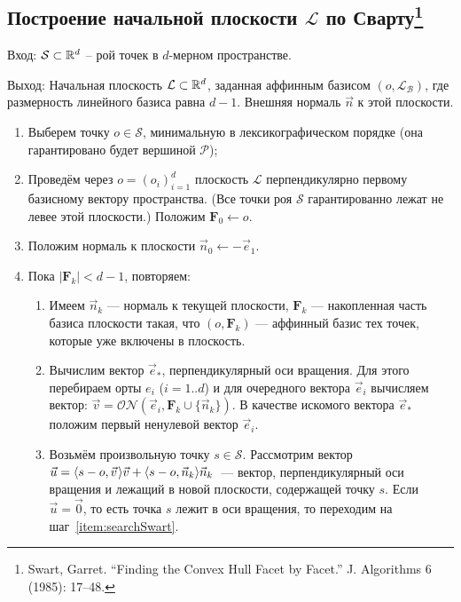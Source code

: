 \documentclass[a4paper,12pt]{article}
\newcommand{\R}[1][]{%
  \ifthenelse{\equal{#1}{}}%
  {\mathbb{R}}%
  {\mathbb{R}^{#1}}}
\newcommand{\Swarm}{\mathcal{S}}              %
\newcommand{\Polytop}{\mathcal{P}}         %
\newcommand{\Basis}{\mathcal{B}}              %
\newcommand{\ZVec}{\vec 0}                    %
\newcommand{\set}[2][]{#1\{ #2 #1\}}                    %
\newcommand{\scalprod}[3][]{#1\langle #2, #3 #1\rangle} %
\newcommand{\ONorm}[3][]{\mathcal{ON}#1( #2, #3 #1)} %
\newcommand{\FinalVec}{\mathbf{F}} %
\newcommand{\Plane}{\mathcal{L}}           %
\renewcommand{\.}{\hspace{0.2ex}}
\begin{document}
  \subsection{Построение начальной плоскости $\Plane$ по Сварту\footnote{Swart, Garret. ``Finding the Convex Hull Facet by Facet.'' J. Algorithms 6 (1985): 17--48.}}
    \label{InitialPlaneSwart}

    Вход: $\Swarm \subset \R[d]$ -- рой точек в $d$-мерном пространстве.

    Выход: Начальная плоскость $\Plane \subset \R[d]$, заданная аффинным базисом $(o,\Plane_\Basis)$, где размерность линейного базиса равна $d-1$. Внешняя нормаль $\vec n$ к этой плоскости.

    \begin{enumerate}
      \item Выберем точку $o \in \Swarm$, минимальную в лексикографическом порядке (она гарантировано будет вершиной $\Polytop$);


      \item Проведём через $o=(o_i)_{i = 1}^{d}$ плоскость $\Plane$ перпендикулярно первому базисному вектору пространства. (Все точки роя $\Swarm$ гарантированно лежат не левее этой плоскости.) Положим $\FinalVec_0 \leftarrow o$.


      \item Положим нормаль к плоскости $\vec n_0 \leftarrow -\vec e_1$.


      \item Пока $|\FinalVec_k| < d - 1$, повторяем:


      \begin{enumerate}
        \item Имеем $\vec n_k$ --- нормаль к текущей плоскости, $\FinalVec_k$ --- накопленная часть базиса плоскости такая, что $(o, \FinalVec_k)$ --- аффинный базис тех точек, которые уже включены в плоскость.


        \item Вычислим вектор $\vec e_*$, перпендикулярный оси вращения. Для этого перебираем орты $e_i$ ($i=1..d$) и для очередного вектора $\vec e_i$ вычисляем вектор: $\vec v = \ONorm{\vec e_i}{\FinalVec_k \cup \set{\vec n_k}}$. В качестве искомого вектора $\vec e_*$ положим первый ненулевой вектор $\vec e_i$.


        \item Возьмём произвольную точку $s \in \Swarm$. Рассмотрим вектор $\vec u = \scalprod{s - o}{\vec v \.}\vec v + \scalprod{s - o}{\vec n_k}\vec n_k$~--- вектор, перпендикулярный оси вращения и лежащий в новой плоскости, содержащей точку $s$. Если $\vec u = \ZVec$, то есть точка $s$ лежит в оси вращения, то переходим на шаг~\ref{item:searchSwart}.
        \label{item:searchSwart}



\end{enumerate}
\end{enumerate}
\end{document}
